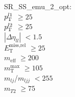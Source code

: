 SR\_SS\_emu\_2\_opt: \\
$p_{\text{T}}^{l1}$ $\geq 25$ \\
$p_{\text{T}}^{l2}$ $\geq 25$ \\
$|\Delta\eta_{ll}|$ $<1.5$ \\
$E_{\text{T}}^{\text{miss,rel}}$ $\geq 25$ \\
$m_{\text{eff}}$ $\geq 200$ \\
$m_{\text{T}}^{\text{max}}$ $\geq 105$ \\
$m_{lj}$/$m_{ljj}$ $<255$ \\
$m_{T2}$ $\geq 75$ \\
